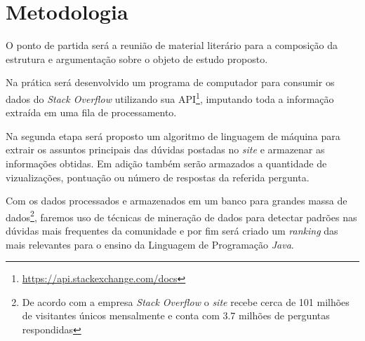 
 
\chapter{Metodologia}\label{cap_exemplos}

O ponto de partida será a reunião de material literário para a composição da estrutura e argumentação sobre o objeto de estudo proposto.

Na prática será desenvolvido um programa de computador para consumir os dados do \textit{Stack Overflow} utilizando sua API\footnote{\url{https://api.stackexchange.com/docs}}, imputando toda a informação extraída em uma fila de processamento.

Na segunda etapa será proposto um algoritmo de linguagem de máquina \cite{Hulth:2003:IAK:1119355.1119383} para extrair os assuntos principais \cite{Turney:2000:LAK:593957.593993} das dúvidas postadas no \textit{site} e armazenar as informações obtidas. Em adição também serão armazados a quantidade de vizualizações, pontuação ou número de respostas da referida pergunta.  

Com os dados processados e armazenados em um banco para grandes massa de dados\footnote{De acordo com a empresa \textit{Stack Overflow} o \textit{site} recebe cerca de 101 milhões de visitantes únicos mensalmente e conta com 3.7 milhões de perguntas respondidas}, faremos uso de técnicas de mineração de dados para detectar padrões nas dúvidas mais frequentes da comunidade e por fim será criado um \textit{ranking} \cite{mihalcea-tarau:2004:EMNLP} das mais relevantes para o ensino da Linguagem de Programação \emph{Java}. 

